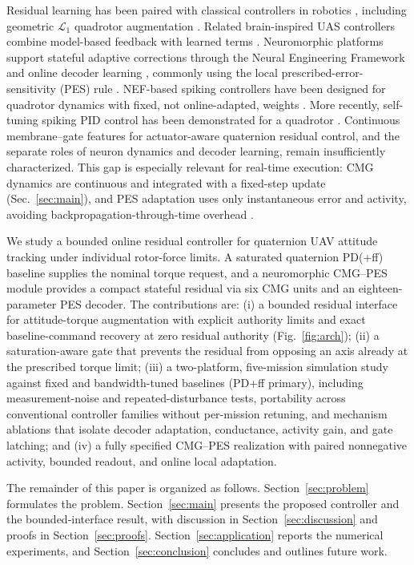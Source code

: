 \documentclass[letterpaper, 10 pt, conference]{ieeeconf}
\begin{document}
Residual learning has been paired with classical controllers in robotics \cite{johannink2019}, including geometric $\mathcal L_1$ quadrotor augmentation \cite{wu2025l1quad}. Related brain-inspired UAS controllers combine model-based feedback with learned terms \cite{rubioscola2023limbic,rubioscola2021mambo}. Neuromorphic platforms support stateful adaptive corrections through the Neural Engineering Framework and online decoder learning \cite{eliasmith2004neuraleng,bekolay2014nengo}, commonly using the local prescribed-error-sensitivity (PES) rule \cite{voelker2015pes}. NEF-based spiking controllers have been designed for quadrotor dynamics with fixed, not online-adapted, weights \cite{garciaalcantara2024snnuas}. More recently, self-tuning spiking PID control has been demonstrated for a quadrotor \cite{olivares2026selftuning}. Continuous membrane--gate features for actuator-aware quaternion residual control, and the separate roles of neuron dynamics and decoder learning, remain insufficiently characterized.
This gap is especially relevant for real-time execution: CMG dynamics are continuous and integrated with a fixed-step update (Sec.~\ref{sec:main}), and PES adaptation uses only instantaneous error and activity, avoiding backpropagation-through-time overhead \cite{voelker2015pes,bellec2020eprop}.

We study a bounded online residual controller for quaternion UAV attitude tracking under individual rotor-force limits. A saturated quaternion PD(+ff) baseline supplies the nominal torque request, and a neuromorphic CMG--PES module provides a compact stateful residual via six CMG units and an eighteen-parameter PES decoder.
The contributions are: (i) a bounded residual interface for attitude-torque augmentation with explicit authority limits and exact baseline-command recovery at zero residual authority (Fig.~\ref{fig:arch}); (ii) a saturation-aware gate that prevents the residual from opposing an axis already at the prescribed torque limit; (iii) a two-platform, five-mission simulation study against fixed and bandwidth-tuned baselines (PD+ff primary), including measurement-noise and repeated-disturbance tests, portability across conventional controller families without per-mission retuning, and mechanism ablations that isolate decoder adaptation, conductance, activity gain, and gate latching; and (iv) a fully specified CMG--PES realization with paired nonnegative activity, bounded readout, and online local adaptation.

The remainder of this paper is organized as follows. Section~\ref{sec:problem} formulates the problem. Section~\ref{sec:main} presents the proposed controller and the bounded-interface result, with discussion in Section~\ref{sec:discussion} and proofs in Section~\ref{sec:proofs}. Section~\ref{sec:application} reports the numerical experiments, and Section~\ref{sec:conclusion} concludes and outlines future work.
\end{document}
